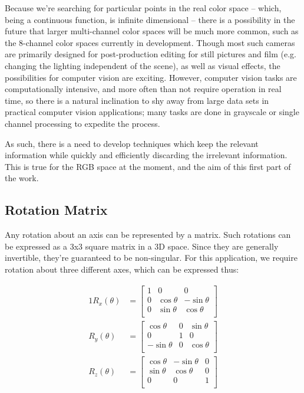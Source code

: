 Because we're searching for particular points in the real color space -- which, being a continuous function, is infinite dimensional -- there is a possibility in the future that larger multi-channel color spaces will be much more common, such as the 8-channel color spaces currently in development. Though most such cameras are primarily designed for post-production editing for still pictures and film (e.g. changing the lighting independent of the scene), as well as visual effects, the possibilities for computer vision are exciting. However, computer vision tasks are computationally intensive, and more often than not require operation in real time, so there is a natural inclination to shy away from large data sets in practical computer vision applications; many tasks are done in grayscale or single channel processing to expedite the process.

As such, there is a need to develop techniques which keep the relevant information while quickly and efficiently discarding the irrelevant information. This is true for the RGB space at the moment, and the aim of this first part of the work.


\subsection{Rotation Matrix}\label{sec:RotationMatrix}

Any rotation about an axis can be represented by a matrix. Such rotations can be expressed as a 3x3 square matrix in a 3D space. Since they are generally invertible, they're guaranteed to be non-singular. For this application, we require rotation about three different axes, which can be expressed thus:


\begin{alignat}{1}
R_x(\theta) &= \begin{bmatrix}
1 & 0 & 0 \\
0 & \cos \theta &  -\sin \theta \\[3pt]
0 & \sin \theta  &  \cos \theta \\[3pt]
\end{bmatrix} \\[6pt]
R_y(\theta) &= \begin{bmatrix}
\cos \theta & 0 & \sin \theta \\[3pt]
0 & 1 & 0 \\[3pt]
-\sin \theta & 0 & \cos \theta \\
\end{bmatrix} \\[6pt]
R_z(\theta) &= \begin{bmatrix}
\cos \theta &  -\sin \theta & 0 \\[3pt]
\sin \theta & \cos \theta & 0\\[3pt]
0 & 0 & 1\\
\end{bmatrix}
\end{alignat}


